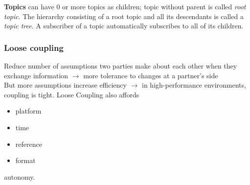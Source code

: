 				\textbf{Topics} can have 0 or more topics as children; topic without parent is called \textit{root topic}. The hierarchy consisting of a root topic and all its descendants is called a \textit{topic tree}. A subscriber of a topic automatically subscribes to all of its children.
				
			\subsubsection{Loose coupling}
				Reduce number of assumptions two parties make about each other when they exchange information $ \rightarrow $ more tolerance to changes at a partner's side\\
				But more assumptions increase efficiency $ \rightarrow $ in high-performance environments, coupling is tight. Loose Coupling also affords	
				\begin{itemize}
					\item platform
					\item time
					\item reference
					\item format
				\end{itemize}
				autonomy.
			
			
			
			
			
			
			
			
			
			
			
			
			